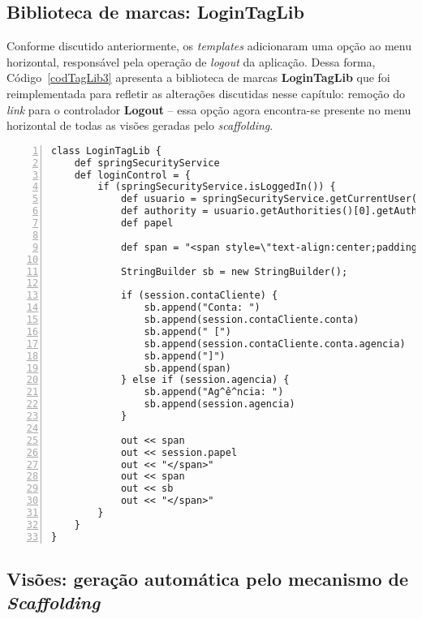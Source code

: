 \subsection{Biblioteca de marcas: LoginTagLib}

\vspace{0.5cm}

Conforme discutido  anteriormente, os {\it  templates} adicionaram uma  opção ao
menu horizontal, responsável  pela operação de {\it logout}  da aplicação. Dessa
forma,   Código~\ref{codTagLib3}   apresenta  a   biblioteca   de  marcas   {\bf
  LoginTagLib}  que foi  reimplementada para  refletir as  alterações discutidas
nesse capítulo:  remoção do {\it link}  para o controlador {\bf  Logout} -- essa
opção agora encontra-se  presente no menu horizontal de  todas as visões geradas
pelo {\it scaffolding}.  

\begin{lstlisting}[caption=Biblioteca  de marca  {\bf  LoginTagLib}, frame=trBL,
    float=htbp, label=codTagLib3, numbers=left] 
class LoginTagLib {
    def springSecurityService
    def loginControl = {
        if (springSecurityService.isLoggedIn()) {
            def usuario = springSecurityService.getCurrentUser() 
            def authority = usuario.getAuthorities()[0].getAuthority()
            def papel
            
            def span = "<span style=\"text-align:center;padding-left:25px;padding-right:25px\">"
            
            StringBuilder sb = new StringBuilder();
            
            if (session.contaCliente) {
                sb.append("Conta: ")
                sb.append(session.contaCliente.conta)
                sb.append(" [")
                sb.append(session.contaCliente.conta.agencia)
                sb.append("]")
                sb.append(span)
            } else if (session.agencia) { 
                sb.append("Ag^ê^ncia: ")
                sb.append(session.agencia)
            }
            
            out << span
            out << session.papel
            out << "</span>"
            out << span
            out << sb
            out << "</span>"
        }
    }
}
\end{lstlisting}

\subsection{Visões: geração automática pelo mecanismo de {\it Scaffolding}}

